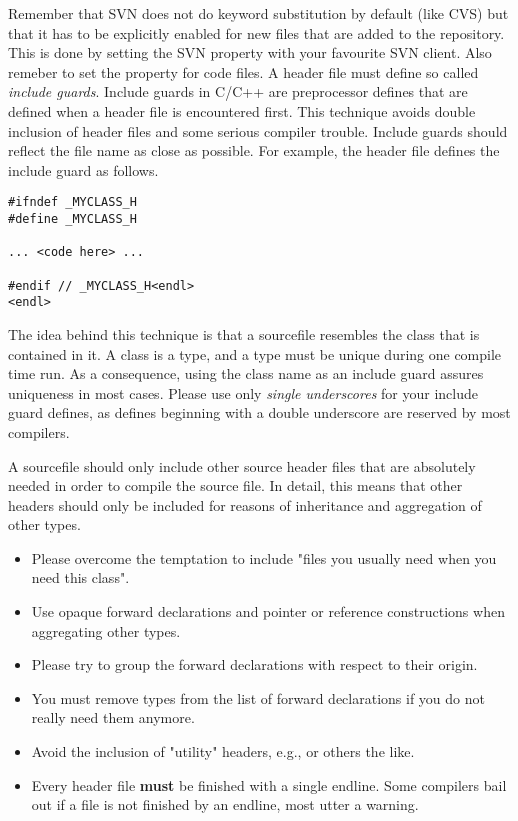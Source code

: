Remember that SVN does not do keyword substitution by default (like CVS) but that it has to be explicitly enabled for new files that are added to the repository. This is done by setting the SVN property  with your favourite SVN client. Also remeber to set the property  for code files.
A header file must define so called \emph{include guards}.
Include guards in C/C++ are preprocessor defines that are defined when a header file is encountered first.
This technique avoids double inclusion of header files and some serious compiler trouble.
Include guards should reflect the file name as close as possible.
For example, the header file  defines the include guard as follows.
\begin{verbatim}
#ifndef _MYCLASS_H
#define _MYCLASS_H

... <code here> ...

#endif // _MYCLASS_H<endl>
<endl>
\end{verbatim}
The idea behind this technique is that a sourcefile resembles the class that is contained in it.
A class is a type, and a type must be unique during one compile time run.
As a consequence, using the class name as an include guard assures uniqueness in most cases.
Please use only \textit{single underscores} for your include guard defines, as defines beginning with a double underscore are reserved by most compilers.


A sourcefile should only include other source header files that are absolutely needed in order to compile the source file.
In detail, this means that other headers should only be included for reasons of inheritance and aggregation of other types.
\begin{itemize}
\item Please overcome the temptation to include "files you usually need when you need this class".
\item Use opaque forward declarations and pointer or reference constructions when aggregating other types.
\item Please try to group the forward declarations with respect to their origin.
\item You must remove types from the list of forward declarations if you do not really need them anymore.
\item Avoid the inclusion of "utility" headers, e.g.,  or others the like.
\item Every header file \textbf{must} be finished with a single endline.
Some compilers bail out if a file is not finished by an endline, most utter a warning.
\end{itemize}

